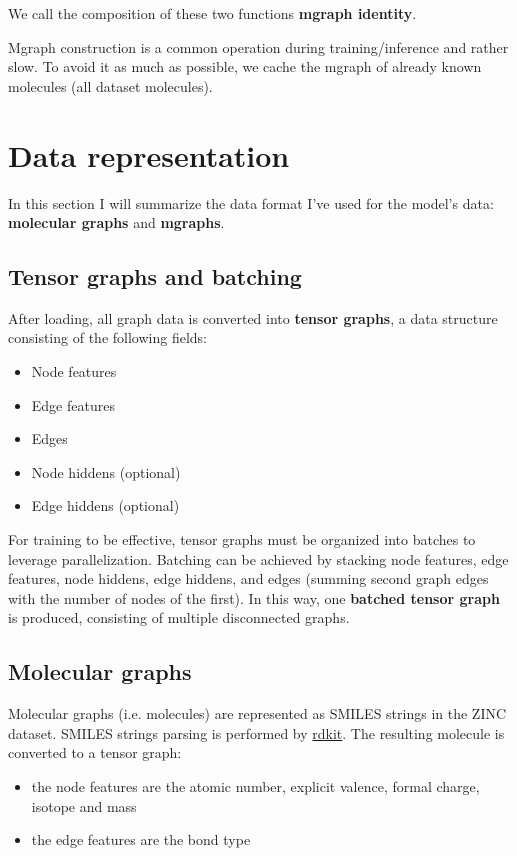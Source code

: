 \documentclass{article}
\begin{document}
We call the composition of these two functions \textbf{mgraph identity}.

Mgraph construction is a common operation during training/inference and rather slow.
To avoid it as much as possible, we cache the mgraph of already known molecules (all dataset molecules).

\section{Data representation}

In this section I will summarize the data format I've used for the model's data: \textbf{molecular graphs} and \textbf{mgraphs}.

\subsection{Tensor graphs and batching}

After loading, all graph data is converted into \textbf{tensor graphs}, a data structure consisting of the following fields:

\begin{itemize}
\item Node features
\item Edge features
\item Edges
\item Node hiddens (optional)
\item Edge hiddens (optional)
\end{itemize}

For training to be effective, tensor graphs must be organized into batches to leverage parallelization.
Batching can be achieved by stacking node features, edge features, node hiddens, edge hiddens, and edges (summing second
graph edges with the number of nodes of the first).
In this way, one \textbf{batched tensor graph} is produced, consisting of multiple disconnected graphs.


\subsection{Molecular graphs}

Molecular graphs (i.e. molecules) are represented as SMILES strings in the ZINC dataset.
SMILES strings parsing is performed by \href{https://www.rdkit.org/}{rdkit}.
The resulting molecule is converted to a tensor graph:
\begin{itemize}
\item the node features are the atomic number, explicit valence, formal charge, isotope and mass
\item the edge features are the bond type
\end{itemize}
\end{document}
